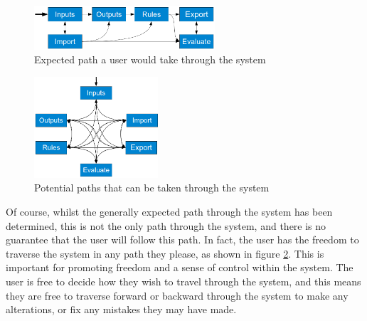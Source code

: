 \begin{figure}[ht!]
\begin{center}
\includegraphics[width=0.6\textwidth]{images/genericPathOne}
\end{center}
\caption{Expected path a user would take through the system}
\label{fig:pathThrough}
\end{figure}
\noindent 
\begin{figure}
\hspace{5mm}
\vspace{-10mm}
	\begin{center}
    \includegraphics[width=0.41\textwidth]{images/web}
	\end{center}
	\vspace{-7mm}
  \caption{Potential paths that can be taken through the system}
  \vspace{-3mm}
  \label{fig:webThrough}
    \vspace{-13mm}
\end{figure}
\noindent
Of course, whilst the generally expected path through the system has been determined, this is not the only path through the system, and there is no guarantee that the user will follow this path. In fact, the user has the freedom to traverse the system in any path they please, as shown in figure \ref{fig:webThrough}. This is important for promoting freedom and a sense of control within the system. The user is free to decide how they wish to travel through the system, and this means they are free to traverse forward or backward through the system to make any alterations, or fix any mistakes they may have made.




\newpage 
